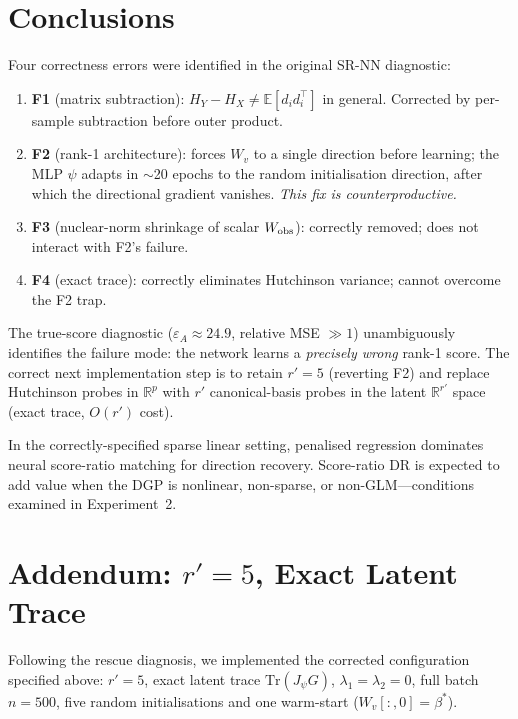 \documentclass[11pt]{article}
\newcommand{\R}{\mathbb{R}}
\newcommand{\E}{\mathbb{E}}
\begin{document}
\section{Conclusions}
\label{sec:conclusions}

Four correctness errors were identified in the original SR-NN diagnostic:
\begin{enumerate}
\item \textbf{F1} (matrix subtraction): $H_Y-H_X\neq\E[d_id_i^\top]$ in general.
  Corrected by per-sample subtraction before outer product.
\item \textbf{F2} (rank-1 architecture): forces $W_v$ to a single direction before
  learning; the MLP $\psi$ adapts in $\sim$20 epochs to the random initialisation
  direction, after which the directional gradient vanishes.
  \emph{This fix is counterproductive.}
\item \textbf{F3} (nuclear-norm shrinkage of scalar $W_{\rm obs}$): correctly
  removed; does not interact with F2's failure.
\item \textbf{F4} (exact trace): correctly eliminates Hutchinson variance; cannot
  overcome the F2 trap.
\end{enumerate}

The true-score diagnostic ($\varepsilon_A\approx24.9$, relative MSE $\gg 1$)
unambiguously identifies the failure mode: the network learns a
\emph{precisely wrong} rank-1 score.  The correct next implementation step is to
retain $r'=5$ (reverting F2) and replace Hutchinson probes in $\R^p$ with $r'$
canonical-basis probes in the latent $\R^{r'}$ space (exact trace, $O(r')$ cost).

In the correctly-specified sparse linear setting, penalised regression dominates
neural score-ratio matching for direction recovery.  Score-ratio DR is expected to
add value when the DGP is nonlinear, non-sparse, or non-GLM—conditions examined in
Experiment~2.

\section{Addendum: $r'=5$, Exact Latent Trace}
\label{sec:final}

Following the rescue diagnosis, we implemented the corrected configuration
specified above: $r'=5$, exact latent trace $\mathrm{Tr}(J_\psi G)$,
$\lambda_1=\lambda_2=0$, full batch $n=500$, five random initialisations and
one warm-start ($W_v[:,0]=\beta^*$).
\end{document}
